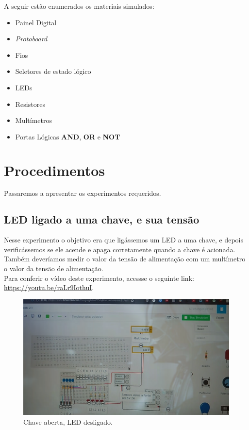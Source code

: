 \documentclass[12pt]{article}
\begin{document}
A seguir estão enumerados os materiais simulados:
\begin{itemize}
    \item Painel Digital
    \item \textit{Protoboard}
    \item Fios
    \item Seletores de estado lógico
    \item LEDs
    \item Resistores
    \item Multímetros
    \item Portas Lógicas \textbf{AND}, \textbf{OR} e \textbf{NOT}
\end{itemize}

\section{Procedimentos}
\label{sec:Procedimentos}

Passaremos a apresentar os experimentos requeridos.

\subsection{LED ligado a uma chave, e sua tensão}
\label{sec:led_chave}

Nesse experimento o objetivo era que ligássemos um LED a uma chave, e depois
verificássemos se ele acende e apaga corretamente quando a chave é acionada.
Também deveríamos medir o valor da tensão de alimentação com um multímetro o
valor da tensão de alimentação.\\
Para conferir o vídeo deste experimento, acessse o seguinte link:
\href{https://youtu.be/raLr9IothuI}{https://youtu.be/raLr9IothuI}.

\begin{figure}[H]
    \centering
    \includegraphics[width=.9\textwidth]{exp1_2.1_f1.png}
    \caption{Chave aberta, LED desligado.}
    \label{fig:exp1_2.1_f1}
\end{figure}
\end{document}
